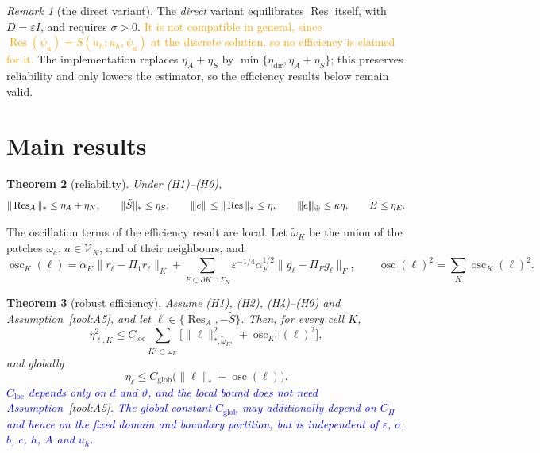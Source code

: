 \documentclass[11pt]{article}
\newcommand{\rev}[1]{\textcolor{blue}{#1}}
\newcommand{\refe}[1]{\textcolor{orange}{#1}}   %
\newcommand{\tnorm}[1]{\lvert\kern-0.25ex\lvert\kern-0.25ex\lvert #1\rvert\kern-0.25ex\rvert\kern-0.25ex\rvert}
\newcommand{\eps}{\varepsilon}
\newcommand{\Res}{\operatorname{Res}}
\newcommand{\osc}{\operatorname{osc}}
\newcommand{\Stil}{\tilde S}
\theoremstyle{plain}
\newtheorem{theorem}{Theorem}[section]
\theoremstyle{remark}
\newtheorem{remark}[theorem]{Remark}
\numberwithin{equation}{section}
\begin{document}
\begin{remark}[the direct variant]\label{rem:direct}
The \emph{direct} variant equilibrates $\Res$ itself, with $D=\eps I$, and requires $\sigma>0$. \refe{It is
not compatible in general, since $\Res(\psi_a)=S(u_h;u_h,\psi_a)$ at the discrete solution, so no
efficiency is claimed for it.} The implementation replaces $\eta_A+\eta_S$ by
$\min\{\eta_{\mathrm{dir}},\eta_A+\eta_S\}$; this preserves reliability and only lowers the
estimator, so the efficiency results below remain valid.
\end{remark}

\section{Main results}\label{sec:results}

\begin{theorem}[reliability]\label{thm:rel}
Under (H1)--(H6),
\[
  \|\Res_A\|_*\le\eta_A+\eta_N,\qquad\|\Stil\|_*\le\eta_S,\qquad
  \tnorm{e}\le\|\Res\|_*\le\eta,\qquad
  \tnorm{e}_\oplus\le\kappa\eta,\qquad E\le\eta_E.
\]
\end{theorem}

The oscillation terms of the efficiency result are local. Let $\tilde\omega_K$ be the union of the
patches $\omega_a$, $a\in\mathcal V_K$, and of their neighbours, and
\[
  \osc_K(\ell)=\alpha_K\|r_\ell-\Pi_1r_\ell\|_K
  +\sum_{F\subset\partial K\cap\Gamma_N}\eps^{-1/4}\alpha_F^{1/2}\|g_\ell-\Pi_Fg_\ell\|_F,
  \qquad\osc(\ell)^2=\sum_K\osc_K(\ell)^2.
\]

\begin{theorem}[robust efficiency]\label{thm:eff}
Assume (H1), (H2), (H4)--(H6) and Assumption~\ref{tool:A5}, and let $\ell\in\{\Res_A,-\Stil\}$.
Then, for every cell $K$,
\[
  \eta_{\ell,K}^2\le C_{\mathrm{loc}}\sum_{K'\subset\tilde\omega_K}
  \bigl[\|\ell\|_{*,\tilde\omega_{K'}}^2+\osc_{K'}(\ell)^2\bigr],
\]
and globally
\[
  \eta_\ell\le C_{\mathrm{glob}}\bigl(\|\ell\|_*+\osc(\ell)\bigr).
\]
\rev{$C_{\mathrm{loc}}$ depends only on $d$ and $\vartheta$, and the local bound does not need
Assumption~\ref{tool:A5}. The global constant $C_{\mathrm{glob}}$ may additionally depend on
$C_\Pi$ and hence on the fixed domain and boundary partition, but is independent of $\eps$, $\sigma$,
$b$, $c$, $h$, $A$ and $u_h$.}
\end{theorem}
\end{document}
